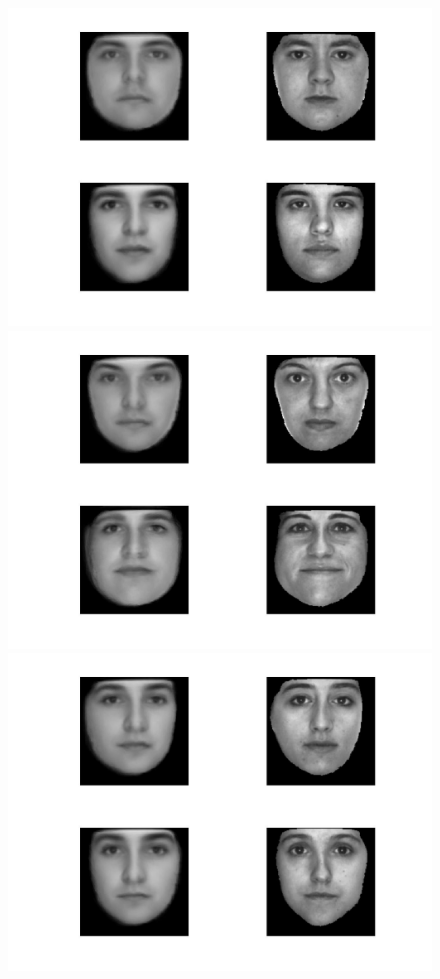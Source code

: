 \documentclass[12pt]{ctexart}
\begin{document}
\begin{enumerate}
\begin{figure}[H]
\includegraphics[scale=0.18]{c_rec_face_wf8.jpg}
\includegraphics[scale=0.18]{c_rec_face_wf9.jpg}
\includegraphics[scale=0.18]{c_rec_face_wf10.jpg}

\end{figure}
\end{enumerate}
\end{document}
